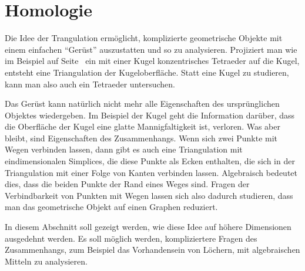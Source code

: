 %
%
%
\section{Homologie
\label{buch:section:homologie}}
Die Idee der Trangulation ermöglicht, komplizierte geometrische 
Objekte mit einem einfachen ``Gerüst'' auszustatten und so zu
analysieren. 
Projiziert man
wie im Beispiel auf Seite~\pageref{buch:homologie:projektion}
ein mit einer Kugel konzentrisches Tetraeder auf die
Kugel, entsteht eine Triangulation der Kugeloberfläche.
Statt eine Kugel zu studieren, kann man also auch ein Tetraeder untersuchen.

Das Gerüst kann natürlich nicht mehr alle Eigenschaften des ursprünglichen
Objektes wiedergeben.
Im Beispiel der Kugel geht die Information darüber, dass die Oberfläche
der Kugel eine glatte Mannigfaltigkeit ist, verloren.
Was aber bleibt, sind Eigenschaften des Zusammenhangs.
Wenn sich zwei Punkte mit Wegen verbinden lassen, dann gibt es auch eine
Triangulation mit eindimensionalen Simplices, die diese Punkte als Ecken
enthalten, die sich in der Triangulation mit einer Folge von Kanten
verbinden lassen.
Algebraisch bedeutet dies, dass die beiden Punkte der Rand eines 
Weges sind.
Fragen der Verbindbarkeit von Punkten mit Wegen lassen sich also
dadurch studieren, dass man das geometrische Objekt auf einen Graphen
reduziert.

In diesem Abschnitt soll gezeigt werden, wie diese Idee auf höhere
Dimensionen ausgedehnt werden.
Es soll möglich werden, kompliziertere Fragen des Zusammenhangs, zum
Beispiel das Vorhandensein von Löchern, mit algebraischen Mitteln
zu analysieren.






